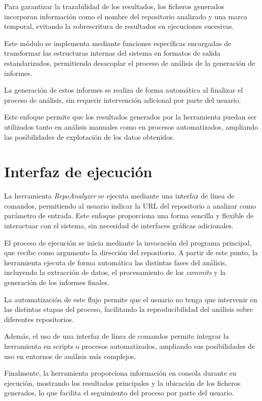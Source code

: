 \documentclass[a4paper, 12pt]{book}
\begin{document}
Para garantizar la trazabilidad de los resultados, los ficheros generados incorporan información como el nombre del repositorio analizado y una marca temporal, evitando la sobrescritura de resultados en ejecuciones sucesivas.

Este módulo se implementa mediante funciones específicas encargadas de transformar las estructuras internas del sistema en formatos de salida estandarizados, permitiendo desacoplar el proceso de análisis de la generación de informes.

La generación de estos informes se realiza de forma automática al finalizar el proceso de análisis, sin requerir intervención adicional por parte del usuario.

Este enfoque permite que los resultados generados por la herramienta puedan ser utilizados tanto en análisis manuales como en procesos automatizados, ampliando las posibilidades de explotación de los datos obtenidos.

\section{Interfaz de ejecución}
\label{sec:interfaz}

La herramienta \emph{RepoAnalyzer} se ejecuta mediante una interfaz de línea de comandos, permitiendo al usuario indicar la URL del repositorio a analizar como parámetro de entrada. Este enfoque proporciona una forma sencilla y flexible de interactuar con el sistema, sin necesidad de interfaces gráficas adicionales.

El proceso de ejecución se inicia mediante la invocación del programa principal, que recibe como argumento la dirección del repositorio. A partir de este punto, la herramienta ejecuta de forma automática las distintas fases del análisis, incluyendo la extracción de datos, el procesamiento de los \emph{commits} y la generación de los informes finales.

La automatización de este flujo permite que el usuario no tenga que intervenir en las distintas etapas del proceso, facilitando la reproducibilidad del análisis sobre diferentes repositorios.

Además, el uso de una interfaz de línea de comandos permite integrar la herramienta en scripts o procesos automatizados, ampliando sus posibilidades de uso en entornos de análisis más complejos.

Finalmente, la herramienta proporciona información en consola durante su ejecución, mostrando los resultados principales y la ubicación de los ficheros generados, lo que facilita el seguimiento del proceso por parte del usuario.
\end{document}
